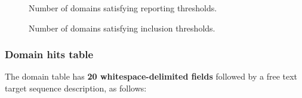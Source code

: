 \begin{description}
\begin{description}
\item[] 
  Number of domains satisfying reporting thresholds.

\item[] 
  Number of domains satisfying inclusion thresholds.

\item[] 
\end{description}








\subsubsection{Domain hits table}

The domain table has \textbf{20 whitespace-delimited fields} followed
by a free text target sequence description, as follows:

\begin{description}
\item[]

\item[]

\item[]

\item[]

\item[]

\item[]

\item[]

\item[]

\item[]

\item[]

\item[]

\item[]

\item[]

\item[]


\end{description}
\end{description}
